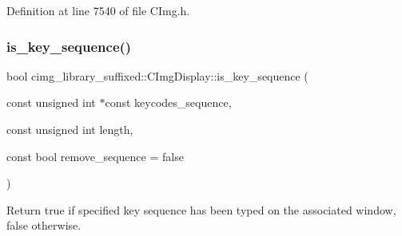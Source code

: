 Definition at line 7540 of file C\+Img.\+h.

\mbox{\label{structcimg__library__suffixed_1_1CImgDisplay_a020fb9bb882e885c1e7e9b82a0183d80}} 
\subsubsection{\texorpdfstring{is\+\_\+key\+\_\+sequence()}{is\_key\_sequence()}}
{\footnotesize\ttfamily bool cimg\+\_\+library\+\_\+suffixed\+::\+C\+Img\+Display\+::is\+\_\+key\+\_\+sequence (\begin{DoxyParamCaption}\item[{const unsigned int $\ast$const}]{keycodes\+\_\+sequence,  }\item[{const unsigned int}]{length,  }\item[{const bool}]{remove\+\_\+sequence = {\ttfamily false} }\end{DoxyParamCaption})\hspace{0.3cm}{\ttfamily [inline]}}



Return {\ttfamily true} if specified key sequence has been typed on the associated window, {\ttfamily false} otherwise. 


